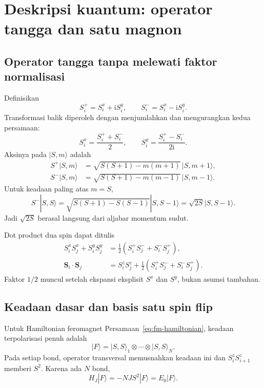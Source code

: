 \documentclass[11pt,a4paper]{article}
\newcommand{\ii}{\mathrm{i}}
\newcommand{\vS}{\bm S}
\begin{document}
\section{Deskripsi kuantum: operator tangga dan satu magnon}

\subsection{Operator tangga tanpa melewati faktor normalisasi}

Definisikan
\begin{equation}
S_i^+=S_i^x+\ii S_i^y,
\qquad
S_i^-=S_i^x-\ii S_i^y.
\end{equation}
Transformasi balik diperoleh dengan menjumlahkan dan mengurangkan kedua persamaan:
\begin{equation}
S_i^x=\frac{S_i^++S_i^-}{2},
\qquad
S_i^y=\frac{S_i^+-S_i^-}{2\ii}.
\end{equation}
Aksinya pada $|S,m\rangle$ adalah
\begin{align}
S^+|S,m\rangle
&=\sqrt{S(S+1)-m(m+1)}\,|S,m+1\rangle,\\
S^-|S,m\rangle
&=\sqrt{S(S+1)-m(m-1)}\,|S,m-1\rangle.
\end{align}
Untuk keadaan paling atas $m=S$,
\begin{equation}
S^-|S,S\rangle
=\sqrt{S(S+1)-S(S-1)}|S,S-1\rangle
=\sqrt{2S}|S,S-1\rangle.
\label{eq:ladder-sqrt2S}
\end{equation}
Jadi $\sqrt{2S}$ berasal langsung dari aljabar momentum sudut.

Dot product dua spin dapat ditulis
\begin{align}
S_i^xS_j^x+S_i^yS_j^y
&=\frac12(S_i^+S_j^-+S_i^-S_j^+),\\
\vS_i\cdot\vS_j
&=S_i^zS_j^z+\frac12(S_i^+S_j^-+S_i^-S_j^+).
\label{eq:spin-dot-ladder}
\end{align}
Faktor $1/2$ muncul setelah ekspansi eksplisit $S^x$ dan $S^y$, bukan asumsi tambahan.

\subsection{Keadaan dasar dan basis satu spin flip}

Untuk Hamiltonian feromagnet Persamaan~\eqref{eq:fm-hamiltonian}, keadaan terpolarisasi penuh adalah
\begin{equation}
|F\rangle=|S,S\rangle_1\otimes\cdots\otimes|S,S\rangle_N.
\end{equation}
Pada setiap bond, operator transversal memusnahkan keadaan ini dan $S_i^zS_{i+1}^z$ memberi $S^2$. Karena ada $N$ bond,
\begin{equation}
H_J|F\rangle=-NJS^2|F\rangle=E_0|F\rangle.
\end{equation}
\end{document}
